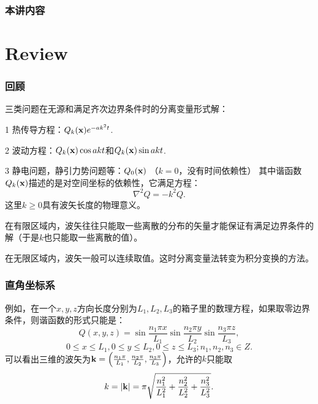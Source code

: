 \documentclass[CJK]{beamer}
\date{}
\begin{document}
  \bch
{}

\begin{frame}
\frametitle{本讲内容}

\tableofcontents

\end{frame}

\section{Review}

\begin{frame}
\frametitle{回顾}

三类问题在无源和满足齐次边界条件时的分离变量形式解：
\bitem
\item[1]{热传导方程：$Q_k({\mathbf{x}})e^{-ak^2t}$.}
\item[2]{波动方程：$Q_k({\mathbf{x}})\cos{akt}$和$Q_k({\mathbf{x}})\sin{akt}$.}
\item[3]{静电问题，静引力势问题等：$Q_0({\mathbf{x}})$ （$k=0$，没有时间依赖性）}  
  \eitem
  其中谐函数$Q_k({\mathbf{x}})$描述的是对空间坐标的依赖性，它满足方程：
  $$ \nabla^2 Q = -k^2Q.$$
  这里$k\ge 0$具有波矢长度的物理意义。
\bitem
\item{在有限区域内，波矢往往只能取一些离散的分布的矢量才能保证有满足边界条件的解（于是$k$也只能取一些离散的值）。}
\item{在无限区域内，波矢一般可以连续取值。这时分离变量法转变为积分变换的方法。}
  \eitem
  
\end{frame}



\begin{frame}
\frametitle{直角坐标系}



例如，在一个$x,y,z$方向长度分别为$L_1,L_2, L_3$的箱子里的数理方程，如果取零边界条件，则谐函数的形式只能是：
$$ Q(x,y,z) = \sin{\frac{n_1\pi x}{L_1}}\sin{\frac{n_2\pi y}{L_2}}\sin{\frac{n_3\pi z}{L_3}},  $$
$$ 0\le x\le L_1, 0\le y\le L_2, 0\le z\le L_3; n_1, n_2, n_3\in Z.$$
可以看出三维的波矢为${\mathbf{k}} = \left(\frac{n_1\pi}{L_1}, \frac{n_2\pi}{L_2}, \frac{n_3\pi}{L_3}\right)$，允许的$k$只能取
$$k=|{\mathbf{k}}|=\pi\sqrt{\frac{n_1^2}{L_1^2}+\frac{n_2^2}{L_2^2}+\frac{n_3^2}{L_3^2}}.$$

\end{frame}
\end{document}
